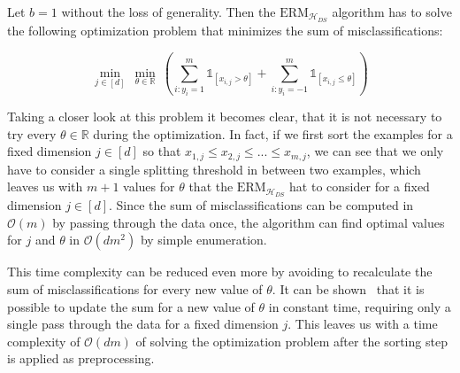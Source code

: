 Let $b=1$ without the loss of generality. Then the $\text{ERM}_{\mathcal{H}_{DS}}$ algorithm has to solve
the following optimization problem that minimizes the sum of misclassifications:
\begin{linenomath}
\begin{equation*}
    \min_{j \in \left[ d \right]} \  \min_{\theta \in \mathbb{R}} \ 
        \left( \sum_{i: y_i=1}^m \mathds{1}_{\left[ x_{i, j} > \theta \right]} + 
            \sum_{i: y_i=-1}^m \mathds{1}_{\left[ x_{i, j} \leq \theta \right]} \right)
\end{equation*}
\end{linenomath}
Taking a closer look at this problem it becomes clear, that it is not necessary to try every $\theta \in \mathbb{R}$
during the optimization.
In fact, if we first sort the examples for a fixed dimension $j \in \left[ d \right]$ so that
$x_{1, j} \leq x_{2, j} \leq ... \leq x_{m, j}$, we can see that we only have to consider a single splitting 
threshold in between two examples, which leaves us with $m+1$ values for $\theta$ that the 
$\text{ERM}_{\mathcal{H}_{DS}}$ hat to consider for a fixed dimension $j \in \left[ d \right]$.
Since the sum of misclassifications can be computed in $\mathcal{O}(m)$ by passing through the data once,
the algorithm can find optimal values for $j$ and $\theta$ in $\mathcal{O}(dm^2)$ by simple enumeration.

This time complexity can be reduced even more by avoiding to recalculate the sum of misclassifications for
every new value of $\theta$. It can be shown~\cite{SSBD14} that it is possible to update the sum for a new
value of $\theta$ in constant time, requiring only a single pass through the data for a fixed dimension $j$.
This leaves us with a time complexity of $\mathcal{O}(dm)$ of solving the optimization problem after the sorting
step is applied as preprocessing.
